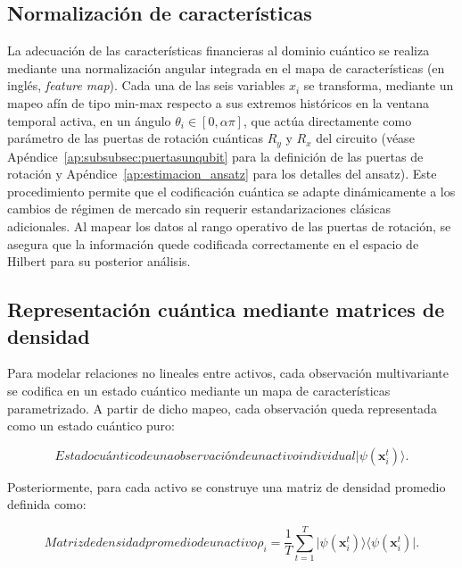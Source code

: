 \subsection{Normalización de características}
\label{subsec:normalizacion_caracteristicas}

La adecuación de las características financieras al dominio cuántico se realiza mediante una normalización angular integrada en el mapa de características (en inglés, \textit{feature map}). Cada una de las seis variables $x_i$ se transforma, mediante un mapeo afín de tipo min-max respecto a sus extremos históricos en la ventana temporal activa, en un ángulo $\theta_i \in [0, \alpha\pi]$, que actúa directamente como parámetro de las puertas de rotación cuánticas $R_y$ y $R_x$ del circuito (véase Apéndice~\ref{ap:subsubsec:puertasunqubit} para la definición de las puertas de rotación y Apéndice~\ref{ap:estimacion_ansatz} para los detalles del ansatz).
Este procedimiento permite que el codificación cuántica se adapte dinámicamente a los cambios de régimen de mercado sin requerir estandarizaciones clásicas adicionales. Al mapear los datos al rango operativo de las puertas de rotación, se asegura que la información quede codificada correctamente en el espacio de Hilbert para su posterior análisis.


\subsection{Representación cuántica mediante matrices de densidad}
\label{subsec:representacion_cuantica}
Para modelar relaciones no lineales entre activos, cada observación multivariante se codifica en un estado cuántico mediante un mapa de características parametrizado. A partir de dicho mapeo, cada observación queda representada como un estado cuántico puro:

\begin{equation}[eq:estado_cuantico_observacion]{Estado cuántico de una observación de un activo individual}
\lvert\psi(\mathbf{x}_i^t)\rangle.
\end{equation}

Posteriormente, para cada activo se construye una matriz de densidad promedio definida como:

\begin{equation}[eq:matriz_densidad_promedio]{Matriz de densidad promedio de un activo}
\rho_i = \frac{1}{T} \sum_{t=1}^{T}
\lvert\psi(\mathbf{x}_i^t)\rangle\langle\psi(\mathbf{x}_i^t)\rvert.
\end{equation}

